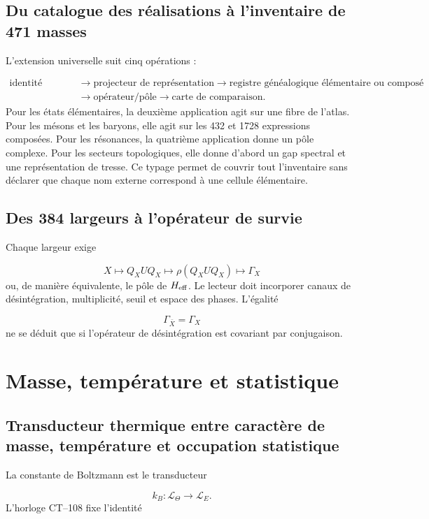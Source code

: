 \subsection{Du catalogue des réalisations à l'inventaire de 471 masses}
L'extension universelle suit cinq opérations :

\[
\begin{aligned}
 \text{identité physique}
 &\longrightarrow
 \text{projecteur de représentation}
 \longrightarrow
 \text{registre généalogique élémentaire ou composé}\\
 &\longrightarrow
 \text{opérateur/pôle}
 \longrightarrow
 \text{carte de comparaison}.
\end{aligned}
\]
Pour les états élémentaires, la deuxième application agit sur une fibre de l'atlas. Pour les mésons et les baryons, elle agit sur les 432 et 1728 expressions composées. Pour les résonances, la quatrième application donne un pôle complexe. Pour les secteurs topologiques, elle donne d'abord un gap spectral et une représentation de tresse. Ce typage permet de couvrir tout l'inventaire sans déclarer que chaque nom externe correspond à une cellule élémentaire.

\subsection{Des 384 largeurs à l'opérateur de survie}
Chaque largeur exige

\[
 X\longmapsto Q_XUQ_X
 \longmapsto \rho(Q_XUQ_X)
 \longmapsto\Gamma_X
\]
ou, de manière équivalente, le pôle de \(H_{\rm eff}\). Le lecteur doit incorporer canaux de désintégration, multiplicité, seuil et espace des phases. L'égalité

\[
 \Gamma_{\bar X}=\Gamma_X
\]
ne se déduit que si l'opérateur de désintégration est covariant par conjugaison.

\section{Masse, température et statistique}
\subsection{Transducteur thermique entre caractère de masse, température et occupation statistique}
La constante de Boltzmann est le transducteur

\[
 k_B:\mathcal L_\Theta\longrightarrow\mathcal L_E.
\]
L'horloge CT--108 fixe l'identité


